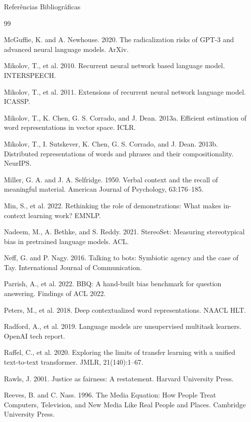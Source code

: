 \documentclass[aspectratio=169]{beamer}
\begin{document}
\begin{frame}[allowframebreaks]{Referências Bibliográficas}
\begin{thebibliography}{99}
{     McGuffie, K. and A. Newhouse. 2020. The radicalization risks of GPT-3 and advanced neural language models. ArXiv.
    
     Mikolov, T., et al. 2010. Recurrent neural network based language model. INTERSPEECH.
    
     Mikolov, T., et al. 2011. Extensions of recurrent neural network language model. ICASSP.
    
     Mikolov, T., K. Chen, G. S. Corrado, and J. Dean. 2013a. Efficient estimation of word representations in vector space. ICLR.
    
     Mikolov, T., I. Sutskever, K. Chen, G. S. Corrado, and J. Dean. 2013b. Distributed representations of words and phrases and their compositionality. NeurIPS.
    
     Miller, G. A. and J. A. Selfridge. 1950. Verbal context and the recall of meaningful material. American Journal of Psychology, 63:176–185.
    
     Min, S., et al. 2022. Rethinking the role of demonstrations: What makes in-context learning work? EMNLP.
    
     Nadeem, M., A. Bethke, and S. Reddy. 2021. StereoSet: Measuring stereotypical bias in pretrained language models. ACL.
    
     Neff, G. and P. Nagy. 2016. Talking to bots: Symbiotic agency and the case of Tay. International Journal of Communication.
    
     Parrish, A., et al. 2022. BBQ: A hand-built bias benchmark for question answering. Findings of ACL 2022.
    
     Peters, M., et al. 2018. Deep contextualized word representations. NAACL HLT.
    
     Radford, A., et al. 2019. Language models are unsupervised multitask learners. OpenAI tech report.
    
     Raffel, C., et al. 2020. Exploring the limits of transfer learning with a unified text-to-text transformer. JMLR, 21(140):1–67.
    
     Rawls, J. 2001. Justice as fairness: A restatement. Harvard University Press.
    
     Reeves, B. and C. Nass. 1996. The Media Equation: How People Treat Computers, Television, and New Media Like Real People and Places. Cambridge University Press.
    
}
\end{thebibliography}
\end{frame}
\end{document}
